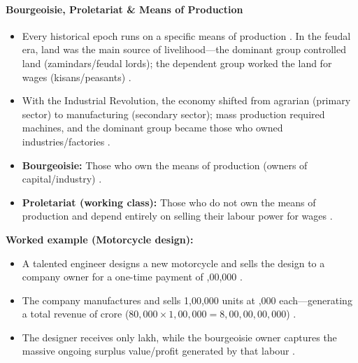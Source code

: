 \paragraph{Bourgeoisie, Proletariat \& Means of Production}
\begin{itemize}
    \item Every historical epoch runs on a specific means of production . In the feudal era, land was the main source of livelihood---the dominant group controlled land (zamindars/feudal lords); the dependent group worked the land for wages (kisans/peasants) .
    \item With the Industrial Revolution, the economy shifted from agrarian (primary sector) to manufacturing (secondary sector); mass production required machines, and the dominant group became those who owned industries/factories .
    \item \textbf{Bourgeoisie:} Those who own the means of production (owners of capital/industry) .
    \item \textbf{Proletariat (working class):} Those who do not own the means of production and depend entirely on selling their labour power for wages .
\end{itemize}

\begin{ExampleBox}
\textbf{Worked example (Motorcycle design):}
\begin{itemize}
    \item A talented engineer designs a new motorcycle and sells the design to a company owner for a one-time payment of ,00,000 .
    \item The company manufactures and sells 1,00,000 units at ,000 each---generating a total revenue of  crore ($80{,}000 \times 1{,}00{,}000 = 8{,}00{,}00{,}00{,}000$) .
    \item The designer receives only  lakh, while the bourgeoisie owner captures the massive ongoing surplus value/profit generated by that labour .
\end{itemize}
\end{ExampleBox}

